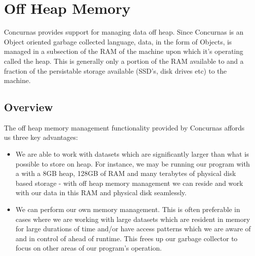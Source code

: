 \documentclass[conc-doc]{subfiles}
\begin{document}
	
	\chapter[Off Heap Memory]{Off Heap Memory}



Concurnas provides support for managing data off heap. Since Concurnas is an Object oriented garbage collected language, data, in the form of Objects, is managed in a subsection of the RAM of the machine upon which it's operating called the heap. This is generally only a portion of the RAM available to and a fraction of the persistable storage available (SSD's, disk drives etc) to the machine.

\section{Overview}
The off heap memory management functionality provided by Concurnas affords us three key advantages: 

\begin{itemize}
	\item We are able to work with datasets which are significantly larger than what is possible to store on heap. For instance, we may be running our program with a with a 8GB heap, 128GB of RAM and many terabytes of physical disk based storage - with off heap memory management we can reside and work with our data in this RAM and physical disk seamlessly.
	\item We can perform our own memory management. This is often preferable in cases where we are working with large datasets which are resident in memory for large durations of time and/or have access patterns which we are aware of and in control of ahead of runtime. This frees up our garbage collector to focus on other areas of our program's operation.
\end{itemize}
\end{document}
